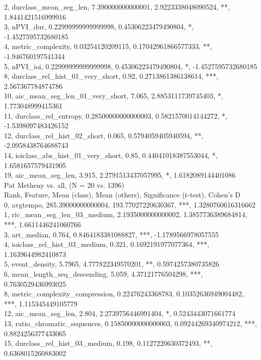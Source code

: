 2, durclass_mean_seg_len, 7.390000000000001, 2.9223338048090524, **, 1.8441421516999916\\
3, nPVI_dur, 0.22999999999999998, 0.45306223479490804, *, -1.4527595732680185\\
4, metric_complexity, 0.03254120209115, 0.17042961866577333, **, -1.946760197541344\\
5, nPVI_ioi, 0.22999999999999998, 0.45306223479490804, *, -1.4527595732680185\\
8, durclass_rel_hist_01_very_short, 0.92, 0.2713861386138614, ***, 2.567367784874786\\
10, aic_mean_seg_len_01_very_short, 7.065, 2.8853111739745403, *, 1.773048999415361\\
11, durclass_rel_entropy, 0.28500000000000003, 0.5821570014144272, *, -1.5398097483426152\\
12, durclass_rel_hist_02_short, 0.065, 0.5794059405940594, **, -2.0958438764688743\\
14, ioiclass_abs_hist_01_very_short, 0.85, 0.44041018387553044, *, 1.6581657579431905\\
19, aic_mean_seg_len, 3.915, 2.2791513437057995, *, 1.6182089144401086\\
Pat Metheny vs. all, (N = 20 vs. 1396)\\
Rank, Feature, Mean (class), Mean (others), Significance (t-test), Cohen's D\\
0, avgtempo, 285.39000000000004, 193.77027220630367, ***, 1.3280760616316662\\
1, ric_mean_seg_len_03_medium, 2.1935000000000002, 1.3857736389684814, ***, 1.6611446241060766\\
3, art_median, 0.764, 0.8464183381088827, ***, -1.1789566978057555\\
4, ioiclass_rel_hist_03_medium, 0.321, 0.1692191977077364, ***, 1.1639644982410873\\
5, event_density, 5.7965, 4.777822349570201, **, 0.5974257380735826\\
6, mean_length_seq_descending, 5.059, 4.37121776504298, ***, 0.7630529436993025\\
8, metric_complexity_compression, 0.22476243368783, 0.10352636949004482, ***, 1.115345449105779\\
12, aic_mean_seg_len, 2.804, 2.2739756446991404, *, 0.5243443071661774\\
13, ratio_chromatic_sequences, 0.15850000000000003, 0.09244269340974212, ***, 0.8824256377433065\\
15, durclass_rel_hist_03_medium, 0.198, 0.1127220630372493, **, 0.6368015260883002\\

